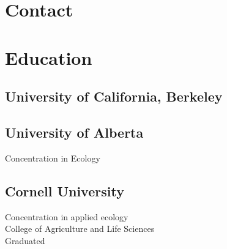 \documentclass[]{deedy-resume-openfont}
\begin{document}
\begin{minipage}[t]{0.32\textwidth} 

\section{Contact} 
\href{https://twitter.com/dpseidel}{} %
\href{https://github.com/dpseidel}{} \hspace{2pt}
\href{https://www.linkedin.com/in/dana-seidel/}{} 
\sectionsep

\section{Education} 
\subsection{University of California, Berkeley}
\sectionsep

\subsection{University of Alberta}
Concentration in Ecology \\
\sectionsep

\subsection{Cornell University}
Concentration in applied ecology \\
College of Agriculture and Life Sciences \\
Graduated 
\sectionsep


\end{minipage}
\end{document}
